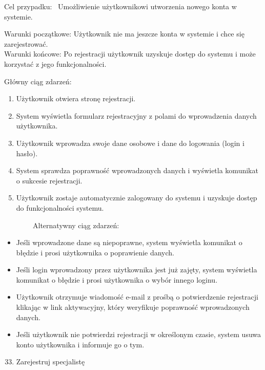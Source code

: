 \documentclass[
]{article}
\providecommand{\tightlist}{%
  \setlength{\itemsep}{0pt}\setlength{\parskip}{0pt}}
\begin{document}
{Cel przypadku: ~Umożliwienie użytkownikowi utworzenia nowego konta w
systemie.}

{Warunki początkowe: Użytkownik nie ma jeszcze konta w systemie i chce
się zarejestrować.\\
Warunki końcowe: Po rejestracji użytkownik uzyskuje dostęp do systemu i
może korzystać z jego funkcjonalności.}

{Główny ciąg zdarzeń:}

\begin{enumerate}
\tightlist
\item
  {Użytkownik otwiera stronę rejestracji.}
\item
  {System wyświetla formularz rejestracyjny z polami do wprowadzenia
  danych użytkownika.}
\item
  {Użytkownik wprowadza swoje dane osobowe i dane do logowania (login i
  hasło).}
\item
  {System sprawdza poprawność wprowadzonych danych i wyświetla komunikat
  o sukcesie rejestracji.}
\item
  {Użytkownik zostaje automatycznie zalogowany do systemu i uzyskuje
  dostęp do funkcjonalności systemu.}
\end{enumerate}

{~~~~~~~~Alternatywny ciąg zdarzeń:}

\begin{itemize}
\tightlist
\item
  {Jeśli wprowadzone dane są niepoprawne, system wyświetla komunikat o
  błędzie i prosi użytkownika o poprawienie danych.}
\item
  {Jeśli login wprowadzony przez użytkownika jest już zajęty, system
  wyświetla komunikat o błędzie i prosi użytkownika o wybór innego
  loginu.}
\item
  {Użytkownik otrzymuje wiadomość e-mail z prośbą o potwierdzenie
  rejestracji klikając w link aktywacyjny, który weryfikuje poprawność
  wprowadzonych danych.}
\item
  {Jeśli użytkownik nie potwierdzi rejestracji w określonym czasie,
  system usuwa konto użytkownika i informuje go o tym.\\
  }
\end{itemize}

{}

\begin{enumerate}
\setcounter{enumi}{32}
\tightlist
\item
  {Zarejestruj specjalistę}
\end{enumerate}
\end{document}
